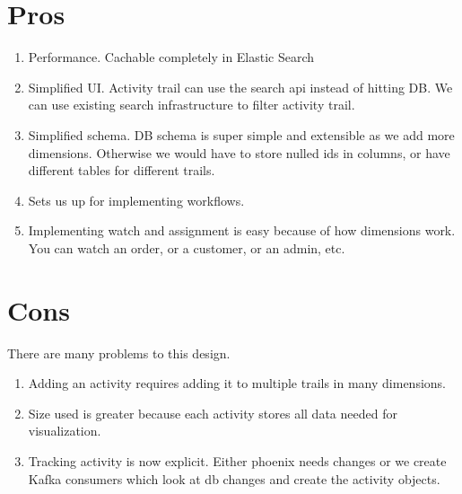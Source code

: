 \documentclass[11pt]{article}
\begin{document}
\section{Pros}
\begin{enumerate}
    \item Performance. Cachable completely in Elastic Search
    \item Simplified UI. Activity trail can use the search api instead of hitting DB.
        We can use existing search infrastructure to filter activity trail.
    \item Simplified schema. DB schema is super simple and extensible as we add more dimensions.
        Otherwise we would have to store nulled ids in columns, or have different tables for
        different trails. 
    \item Sets us up for implementing workflows.
    \item Implementing watch and assignment is easy because of how dimensions work. You can
        watch an order, or a customer, or an admin, etc.
\end{enumerate}

\section{Cons}

There are many problems to this design.

\begin{enumerate}
    \item Adding an activity requires adding it to multiple trails in many dimensions. 
    \item Size used is greater because each activity stores all data needed for visualization.
    \item Tracking activity is now explicit. Either phoenix needs changes or we create
           Kafka consumers which look at db changes and create the activity objects.
\end{enumerate}
\end{document}
